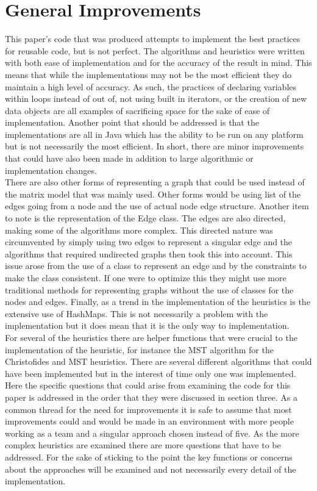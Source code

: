 \documentclass[midd]{thesis}
\newcommand{\tab}{\hspace*{2em}}
\begin{document}
\section{General Improvements}
\tab This paper's code that was produced attempts to implement the best practices for reusable code, but is not perfect. The algorithms and heuristics were written with both ease of implementation and for the accuracy of the result in mind. This means that while the implementations may not be the most efficient they do maintain a high level of accuracy. As such, the practices of declaring variables within loops instead of out of, not using built in iterators, or the creation of new data objects are all examples of sacrificing space for the sake of ease of implementation. Another point that should be addressed is that the implementations are all in Java which has the ability to be run on any platform but is not necessarily the most efficient. In short, there are minor improvements that could have also been made in addition to large algorithmic or implementation changes.\\
\tab There are also other forms of representing a graph that could be used instead of the matrix model that was mainly used. Other forms would be using list of the edges going from a node and the use of actual node edge structure. Another item to note is the representation of the Edge  class. The edges are also directed, making some of the algorithms more complex. This directed nature was circumvented by simply using two edges to represent a singular edge and the algorithms that required undirected graphs then took this into account. This issue arose from the use of a class to represent an edge and by the constraints to make the class consistent. If one were to optimize this they might use more traditional methods for representing graphs without the use of classes for the nodes and edges. Finally, as a trend in the implementation of the heuristics is the extensive use of HashMaps. This is not necessarily a problem with the implementation but it does mean that it is the only way to implementation.\\
\tab For several of the heuristics there are helper functions that were crucial to the implementation of the heuristic, for instance the MST algorithm for the Christofides and MST heuristics. There are several different algorithms that could have been implemented but in the interest of time only one was implemented. Here the specific questions that could arise from examining the code for this paper is addressed in the order that they were discussed in section three. As a common thread for the need for improvements it is safe to assume that most improvements could and would be made in an environment with more people working as a team and a singular approach chosen instead of five. As the more complex heuristics are examined there are more questions that have to be addressed. For the sake of sticking to the point the key functions or concerns about the approaches will be examined and not necessarily every detail of the implementation.\\
\end{document}

